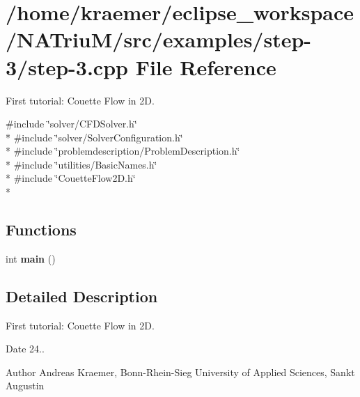 \hypertarget{step-3_8cpp}{\section{/home/kraemer/eclipse\-\_\-workspace/\-N\-A\-Triu\-M/src/examples/step-\/3/step-\/3.cpp File Reference}
\label{step-3_8cpp}
}


First tutorial\-: Couette Flow in 2\-D.  


{\ttfamily \#include \char`\"{}solver/\-C\-F\-D\-Solver.\-h\char`\"{}}\\*
{\ttfamily \#include \char`\"{}solver/\-Solver\-Configuration.\-h\char`\"{}}\\*
{\ttfamily \#include \char`\"{}problemdescription/\-Problem\-Description.\-h\char`\"{}}\\*
{\ttfamily \#include \char`\"{}utilities/\-Basic\-Names.\-h\char`\"{}}\\*
{\ttfamily \#include \char`\"{}Couette\-Flow2\-D.\-h\char`\"{}}\\*
\subsection*{Functions}
\begin{DoxyCompactItemize}
\item 
\hypertarget{step-3_8cpp_ae66f6b31b5ad750f1fe042a706a4e3d4}{int {\bfseries main} ()}\label{step-3_8cpp_ae66f6b31b5ad750f1fe042a706a4e3d4}

\end{DoxyCompactItemize}


\subsection{Detailed Description}
First tutorial\-: Couette Flow in 2\-D. \begin{DoxyDate}{Date}
24.. 
\end{DoxyDate}
\begin{DoxyAuthor}{Author}
Andreas Kraemer, Bonn-\/\-Rhein-\/\-Sieg University of Applied Sciences, Sankt Augustin 
\end{DoxyAuthor}
